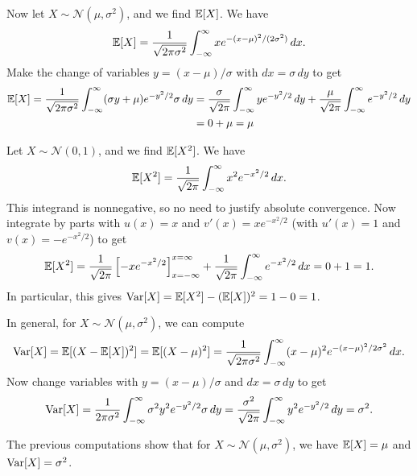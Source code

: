 \begin{example}
  Now let $X \sim \mathcal{N}(\mu, \sigma^2)$, and
  we find $\mathbb{E}[X]$. We have
  \[
    \mathbb{E}[X] = \frac{1}{\sqrt{2\pi \sigma^2}} \int_{-\infty}^\infty x e^{-(x - \mu)^2 / (2\sigma^2)} \, dx.
  \]
  Make the change of variables $y = (x - \mu) / \sigma$
  with $dx = \sigma\, dy$ to get
  \begin{align*}
    \mathbb{E}[X]
    = \frac{1}{\sqrt{2\pi \sigma^2}}
    \int_{-\infty}^\infty (\sigma y + \mu) e^{-y^2 / 2} \sigma\, dy
    &= \frac{\sigma}{\sqrt{2\pi}} \int_{-\infty}^\infty y e^{-y^2 / 2} \, dy + \frac{\mu}{\sqrt{2\pi}} \int_{-\infty}^\infty e^{-y^2 / 2} \, dy \\
    &= 0 + \mu = \mu
  \end{align*}
\end{example}

\begin{example}
  Let $X \sim \mathcal{N}(0, 1)$, and we find
  $\mathbb{E}[X^2]$. We have
  \[
    \mathbb{E}[X^2] = \frac{1}{\sqrt{2\pi}} \int_{-\infty}^\infty x^2 e^{-x^2 / 2} \, dx.
  \]
  This integrand is nonnegative, so no need to justify
  absolute convergence. Now integrate by parts
  with $u(x) = x$ and $v'(x) = x e^{-x^2 / 2}$ (with
  $u'(x) = 1$ and $v(x) = -e^{-x^2 / 2}$) to get
  \[
    \mathbb{E}[X^2] = \frac{1}{\sqrt{2\pi}} \left[ -x e^{-x^2 / 2} \right]_{x = -\infty}^{x = \infty} + \frac{1}{\sqrt{2\pi}} \int_{-\infty}^\infty e^{-x^2 / 2} \, dx = 0 + 1 = 1.
  \]
  In particular, this gives
  $\operatorname{Var}[X] = \mathbb{E}[X^2] - (\mathbb{E}[X])^2 = 1 - 0 = 1$.
\end{example}

\begin{example}
  In general, for $X \sim \mathcal{N}(\mu, \sigma^2)$,
  we can compute
  \[
    \operatorname{Var}[X] = \mathbb{E}[(X - \mathbb{E}[X])^2]
    = \mathbb{E}[(X - \mu)^2]
    = \frac{1}{\sqrt{2\pi \sigma^2}}
    \int_{-\infty}^\infty (x - \mu)^2 e^{-(x - \mu)^2 / 2\sigma^2}\, dx.
  \]
  Now change variables with
  $y = (x - \mu) / \sigma$ and $dx = \sigma\, dy$ to get
  \[
    \operatorname{Var}[X] = \frac{1}{2\pi \sigma^2} \int_{-\infty}^\infty \sigma^2 y^2 e^{-y^2 / 2} \sigma\, dy
    = \frac{\sigma^2}{\sqrt{2\pi}} \int_{-\infty}^\infty y^2 e^{-y^2 / 2} \, dy
    = \sigma^2.
  \]
\end{example}

\begin{remark}
  The previous computations show that
  for $X \sim \mathcal{N}(\mu, \sigma^2)$, we have
  $\mathbb{E}[X] = \mu$ and $\operatorname{Var}[X] = \sigma^2$.
\end{remark}

